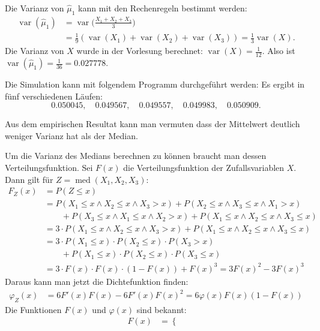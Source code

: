 \begin{loesung}
\begin{teilaufgaben}
\item Die Varianz von $\hat\mu_1$ kann mit den Rechenregeln bestimmt werden:
\begin{align*}
\operatorname{var}(\hat\mu_1)&=\operatorname{var}\biggl(\frac{X_1+X_2+X_3}3\biggr)
\\
&=\frac19(
\operatorname{var}(X_1)+
\operatorname{var}(X_2)+
\operatorname{var}(X_3)
)
=\frac13\operatorname{var}(X).
\end{align*}
Die Varianz von $X$ wurde in der Vorlesung berechnet:
$\operatorname{var}(X)=\frac1{12}$. Also ist
$\operatorname{var}(\hat\mu_1)=\frac1{36}=0.027778$.
\item Die Simulation kann mit folgendem Programm durchgeführt werden:
Es ergibt in fünf verschiedenen Läufen:
\[
0.050045,\quad
0.049567,\quad
0.049557,\quad
0.049983,\quad
0.050909.
\]
\item
Aus dem empirischen Resultat kann man vermuten dass der Mittelwert
deutlich weniger Varianz hat als der Median.
\item
Um die Varianz des Medians berechnen zu können braucht man dessen
Verteilungsfunktion.
Sei $F(x)$ die Verteilungsfunktion der Zufallsvariablen $X$.
Dann gilt für $Z=\operatorname{med}(X_1,X_2,X_3)$:
\begin{align*}
F_Z(x)&=P(Z\le x)\\
&=P(X_1\le x\wedge X_2\le x\wedge X_3 > x)
+P(X_2\le x\wedge X_3\le x\wedge X_1 > x)\\
&\qquad+P(X_3\le x\wedge X_1\le x\wedge X_2 > x)
+ P(X_1\le x\wedge X_2\le x\wedge X_3\le x)\\
&=3\cdot P(X_1\le x\wedge X_2\le x\wedge X_3 > x) 
+ P(X_1\le x\wedge X_2\le x\wedge X_3\le x)\\
&=3\cdot P(X_1\le x)\cdot P(X_2\le x)\cdot P(X_3 > x)\\
&\qquad
+P(X_1\le x)\cdot P(X_2\le x)\cdot P(X_3\le x)\\
&=3\cdot F(x)\cdot F(x)\cdot (1-F(x))+F(x)^3=3F(x)^2-3F(x)^3
\end{align*}
Daraus kann man jetzt die Dichtefunktion finden:
\begin{align*}
\varphi_Z(x)
&=
6F'(x)F(x)-6F'(x)F(x)^2=6\varphi(x)F(x)(1-F(x))
\end{align*}
Die Funktionen $F(x)$ und $\varphi(x)$ sind bekannt:
\begin{align*}
F(x)&=\begin{cases}

\end{cases}
\end{align*}
\end{teilaufgaben}
\end{loesung}
